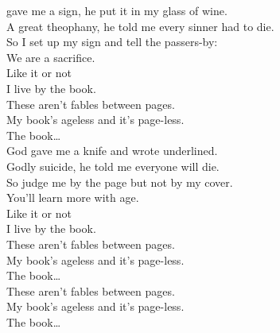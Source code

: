  gave me a sign, he put it in my glass of wine. \\
A great theophany, he told me every sinner had to die. \\
So I set up my sign and tell the passers-by: \\
We are a sacrifice. \\
Like it or not \\
I live by the book. \\

These aren't fables between pages. \\
My book's ageless and it's page-less. \\

The book… \\

God gave me a knife and wrote  underlined. \\
Godly suicide, he told me everyone will die. \\
So judge me by the page but not by my cover. \\
You'll learn more with age. \\
Like it or not \\
I live by the book. \\

These aren't fables between pages. \\
My book's ageless and it's page-less. \\

The book… \\

These aren't fables between pages. \\
My book's ageless and it's page-less. \\

The book… \\










